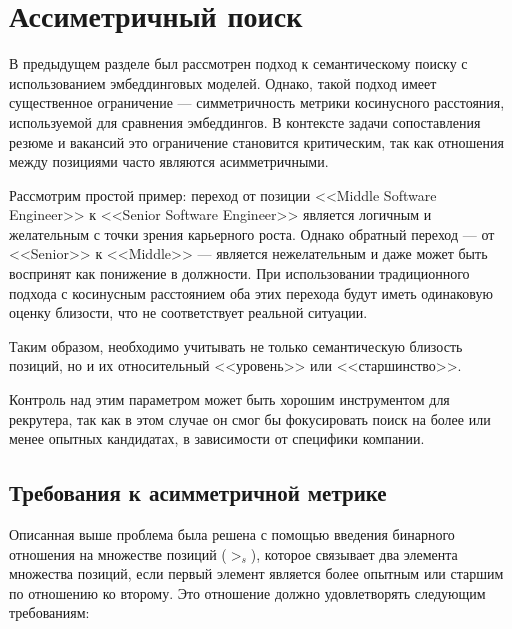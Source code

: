 \documentclass[14pt]{mmcs_article}
\begin{document}
\newpage
\section{Ассиметричный поиск}\label{assymetric_search}

В предыдущем разделе был рассмотрен подход к семантическому поиску с использованием эмбеддинговых моделей. Однако, такой подход имеет существенное ограничение --- симметричность метрики косинусного расстояния, используемой для сравнения эмбеддингов. В контексте задачи сопоставления резюме и вакансий это ограничение становится критическим, так как отношения между позициями часто являются асимметричными.

Рассмотрим простой пример: переход от позиции <<Middle Software Engineer>> к <<Senior Software Engineer>> является логичным и желательным с точки зрения карьерного роста. Однако обратный переход --- от <<Senior>> к <<Middle>> --- является нежелательным и даже может быть воспринят как понижение в должности. При использовании традиционного подхода с косинусным расстоянием оба этих перехода будут иметь одинаковую оценку близости, что не соответствует реальной ситуации.

Таким образом, необходимо учитывать не только семантическую близость позиций, но и их относительный <<уровень>> или <<старшинство>>.

Контроль над этим параметром может быть хорошим инструментом для рекрутера, так как в этом случае он смог бы фокусировать поиск на более или менее опытных кандидатах, в зависимости от специфики компании.

\subsection{Требования к асимметричной метрике}

Описанная выше проблема была решена с помощью введения бинарного отношения на множестве позиций ($>_{s}$), которое связывает два элемента множества позиций, если первый элемент является более опытным или старшим по отношению ко второму. Это отношение должно удовлетворять следующим требованиям:
\end{document}
